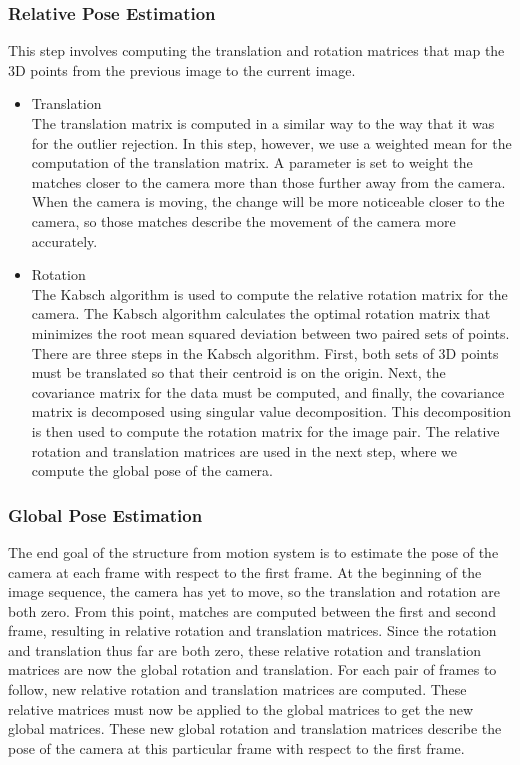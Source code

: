 \subsubsection{Relative Pose Estimation}
	This step involves computing the translation and rotation matrices that map the 3D points from the previous image to the current image.
\begin{itemize}
\item{Translation} \\
	The translation matrix is computed in a similar way to the way that it was for the outlier rejection. In this step, however, we use a weighted mean for the computation of the translation matrix. A parameter is set to weight the matches closer to the camera more than those further away from the camera. When the camera is moving, the change will be more noticeable closer to the camera, so those matches describe the movement of the camera more accurately. 
\item{Rotation} \\
	The Kabsch algorithm is used to compute the relative rotation matrix for the camera. The Kabsch algorithm calculates the optimal rotation matrix that minimizes the root mean squared deviation between two paired sets of points. There are three steps in the Kabsch algorithm. First, both sets of 3D points must be translated so that their centroid is on the origin. Next, the covariance matrix for the data must be computed, and finally, the covariance matrix is decomposed using singular value decomposition. This decomposition is then used to compute the rotation matrix for the image pair. The relative rotation and translation matrices are used in the next step, where we compute the global pose of the camera.
\end{itemize}

\subsubsection{Global Pose Estimation}
	The end goal of the structure from motion system is to estimate the pose of the camera at each frame with respect to the first frame. At the beginning of the image sequence, the camera has yet to move, so the translation and rotation are both zero. From this point, matches are computed between the first and second frame, resulting in relative rotation and translation matrices. Since the rotation and translation thus far are both zero, these relative rotation and translation matrices are now the global rotation and translation. For each pair of frames to follow, new relative rotation and translation matrices are computed. These relative matrices must now be applied to the global matrices to get the new global matrices. These new global rotation and translation matrices describe the pose of the camera at this particular frame with respect to the first frame.


